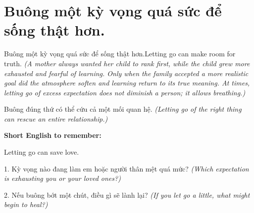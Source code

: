 \section{Buông một kỳ vọng quá sức để sống thật hơn.}
\begin{truyen}{Buông một kỳ vọng quá sức để sống thật hơn.}{Letting go can make room for truth.}
\textit{(A mother always wanted her child to rank first, while the child grew more exhausted and fearful of learning. Only when the family accepted a more realistic goal did the atmosphere soften and learning return to its true meaning. At times, letting go of excess expectation does not diminish a person; it allows breathing.)}
\end{truyen}
\begin{baihoc}
Buông đúng thứ có thể cứu cả một mối quan hệ.
\textit{(Letting go of the right thing can rescue an entire relationship.)}
\end{baihoc}
\begin{ghinhoanh}
\textbf{Short English to remember:}

Letting go can save love.
\end{ghinhoanh}
\begin{tuhocnhanh}
1. Kỳ vọng nào đang làm em hoặc người thân mệt quá mức? \textit{(Which expectation is exhausting you or your loved ones?)}

2. Nếu buông bớt một chút, điều gì sẽ lành lại? \textit{(If you let go a little, what might begin to heal?)}
\end{tuhocnhanh}
\ngancach

